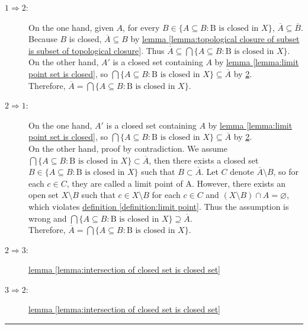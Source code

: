 \documentclass[12pt]{article}
\numberwithin{equation}{section}
\theoremstyle{plain} %
\theoremstyle{definition}
\theoremstyle{remark}
\newenvironment{proof}{{\bf Proof:}}{\hfill\rule{2mm}{2mm}}
\begin{document}
\begin{proof}
\begin{description}
	\item[$1 \Rightarrow 2$:] On the one hand, given $A$, for every $B \in \{A \subseteq B: \text{B is closed in }X\}$, $\overline{A} \subseteq \overline{B}$. Because $B$ is closed, $\overline{A} \subseteq {B}$ by \hyperref[lemma:topological closure of subset is subset of topological closure]{lemma \ref*{lemma:topological closure of subset is subset of topological closure}}. Thus $\overline{A} \subseteq \bigcap \{A \subseteq B: \text{B is closed in }X\}$. \\
	On the other hand, $A'$ is a closed set containing $A$ by \hyperref[lemma:limit point set is closed]{lemma \ref*{lemma:limit point set is closed}}, so $\bigcap \{A \subseteq B: \text{B is closed in }X\} \subseteq \overline{A}$ by \hyperref[definition:closure 2]{2}. \\
	Therefore, $\overline{A} = \bigcap \{A \subseteq B: \text{B is closed in }X\}$. 
	\item[$2 \Rightarrow 1$:] On the one hand, $A'$ is a closed set containing $A$ by \hyperref[lemma:limit point set is closed]{lemma \ref*{lemma:limit point set is closed}}, so $\bigcap \{A \subseteq B: \text{B is closed in }X\} \subseteq \overline{A}$ by \hyperref[definition:closure 2]{2}. \\
	On the other hand, proof by contradiction. We assume $\bigcap \{A \subseteq B: \text{B is closed in }X\} \subset \overline{A}$, then there exists a closed set $B \in \{A \subseteq B: \text{B is closed in }X\}$ such that $B \subset \overline{A}$. Let $C$ denote $\overline{A} \setminus B$, so for each $c \in C$, they are called a limit point of A. However, there exists an open set $X \setminus B$ such that $c \in X \setminus B$ for each $c \in C$ and $(X \setminus B) \cap A = \varnothing$, which violates \hyperref[definition:limit point]{definition \ref*{definition:limit point}}. Thus the assumption is wrong and $\bigcap \{A \subseteq B: \text{B is closed in }X\} \supseteq \overline{A}$.\\
	Therefore, $\overline{A} = \bigcap \{A \subseteq B: \text{B is closed in }X\}$. \\
	\item[$2 \Rightarrow 3$:] \hyperref[lemma:intersection of closed set is closed set]{lemma \ref*{lemma:intersection of closed set is closed set}} 
	\item[$3 \Rightarrow 2$:] \hyperref[lemma:intersection of closed set is closed set]{lemma \ref*{lemma:intersection of closed set is closed set}} 
\end{description}
\end{proof}
\end{document}
